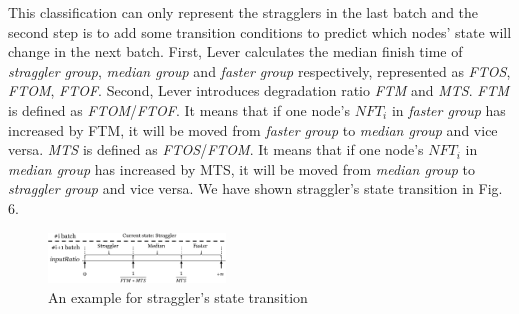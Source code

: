 \documentclass[10pt,conference,compsocconf,letterpaper]{IEEEtran}
\begin{document}
  This classification can only represent the stragglers in the last batch and the second step is to add some transition conditions to predict which nodes' state will change in the next batch. First, Lever calculates the median finish time of \emph{straggler group}, \emph{median group} and \emph{faster group} respectively, represented as \emph{FTOS}, \emph{FTOM}, \emph{FTOF}. Second, Lever introduces degradation ratio \emph{FTM} and \emph{MTS}. \emph{FTM} is defined as \emph{FTOM}/\emph{FTOF}. It means that if one node's $NFT_i$ in \emph{faster group} has increased by FTM, it will be moved from \emph{faster group} to \emph{median group} and vice versa. \emph{MTS} is defined as \emph{FTOS}/\emph{FTOM}. It means that if one node's $NFT_i$ in \emph{median group} has increased by MTS, it will be moved from \emph{median group} to \emph{straggler group} and vice versa. We have shown straggler's state transition in Fig. 6.
  \begin{figure}[htbp]
    \centering
    \includegraphics[width=0.42\textwidth]{FigureI2}
    \caption{An example for straggler's state transition}
    \label{Fig. 6:}
  \end{figure}
\end{document}
